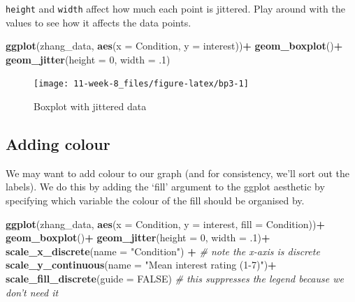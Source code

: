 \documentclass[]{book}
\newenvironment{Shaded}{\begin{snugshade}}{\end{snugshade}}
\newcommand{\CommentTok}[1]{\textcolor[rgb]{0.56,0.35,0.01}{\textit{#1}}}
\newcommand{\DataTypeTok}[1]{\textcolor[rgb]{0.13,0.29,0.53}{#1}}
\newcommand{\DecValTok}[1]{\textcolor[rgb]{0.00,0.00,0.81}{#1}}
\newcommand{\FloatTok}[1]{\textcolor[rgb]{0.00,0.00,0.81}{#1}}
\newcommand{\KeywordTok}[1]{\textcolor[rgb]{0.13,0.29,0.53}{\textbf{#1}}}
\newcommand{\NormalTok}[1]{#1}
\newcommand{\OperatorTok}[1]{\textcolor[rgb]{0.81,0.36,0.00}{\textbf{#1}}}
\newcommand{\OtherTok}[1]{\textcolor[rgb]{0.56,0.35,0.01}{#1}}
\newcommand{\StringTok}[1]{\textcolor[rgb]{0.31,0.60,0.02}{#1}}
\begin{document}
\texttt{height} and \texttt{width} affect how much each point is jittered. Play around with the values to see how it affects the data points.

\begin{Shaded}
\begin{Highlighting}[]
\KeywordTok{ggplot}\NormalTok{(zhang_data, }\KeywordTok{aes}\NormalTok{(}\DataTypeTok{x =}\NormalTok{ Condition, }\DataTypeTok{y =}\NormalTok{ interest))}\OperatorTok{+}
\StringTok{  }\KeywordTok{geom_boxplot}\NormalTok{()}\OperatorTok{+}
\StringTok{  }\KeywordTok{geom_jitter}\NormalTok{(}\DataTypeTok{height =} \DecValTok{0}\NormalTok{, }\DataTypeTok{width =} \FloatTok{.1}\NormalTok{)}
\end{Highlighting}
\end{Shaded}

\begin{figure}

{\centering \texttt{[image: 11-week-8\_files/figure-latex/bp3-1]} 

}

\caption{Boxplot with jittered data}\label{fig:bp3}
\end{figure}

\hypertarget{adding-colour}{%
\subsection{Adding colour}\label{adding-colour}}

We may want to add colour to our graph (and for consistency, we'll sort out the labels). We do this by adding the `fill' argument to the ggplot aesthetic by specifying which variable the colour of the fill should be organised by.

\begin{Shaded}
\begin{Highlighting}[]
\KeywordTok{ggplot}\NormalTok{(zhang_data, }\KeywordTok{aes}\NormalTok{(}\DataTypeTok{x =}\NormalTok{ Condition, }\DataTypeTok{y =}\NormalTok{ interest, }\DataTypeTok{fill =}\NormalTok{ Condition))}\OperatorTok{+}
\StringTok{  }\KeywordTok{geom_boxplot}\NormalTok{()}\OperatorTok{+}
\StringTok{  }\KeywordTok{geom_jitter}\NormalTok{(}\DataTypeTok{height =} \DecValTok{0}\NormalTok{, }\DataTypeTok{width =} \FloatTok{.1}\NormalTok{)}\OperatorTok{+}
\StringTok{  }\KeywordTok{scale_x_discrete}\NormalTok{(}\DataTypeTok{name =} \StringTok{"Condition"}\NormalTok{) }\OperatorTok{+}\StringTok{ }\CommentTok{# note the x-axis is discrete}
\StringTok{  }\KeywordTok{scale_y_continuous}\NormalTok{(}\DataTypeTok{name =} \StringTok{"Mean interest rating (1-7)"}\NormalTok{)}\OperatorTok{+}
\StringTok{  }\KeywordTok{scale_fill_discrete}\NormalTok{(}\DataTypeTok{guide =} \OtherTok{FALSE}\NormalTok{) }\CommentTok{# this suppresses the legend because we don't need it}
\end{Highlighting}
\end{Shaded}
\end{document}

